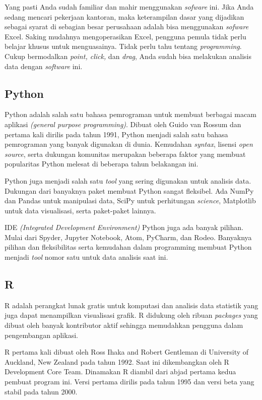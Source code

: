 \documentclass[openany]{book}
\begin{document}
Yang pasti Anda sudah familiar dan mahir menggunakan \emph{sofware} ini.
Jika Anda sedang mencari pekerjaan kantoran, maka keterampilan dasar
yang dijadikan sebagai syarat di sebagian besar perusahaan adalah bisa
menggunakan \emph{sofware} Excel. Saking mudahnya mengoperasikan Excel,
pengguna pemula tidak perlu belajar khusus untuk menguasainya. Tidak
perlu tahu tentang \emph{programming}. Cukup bermodalkan \emph{point,
click,} dan \emph{drag}, Anda sudah bisa melakukan analisis data dengan
\emph{software} ini.

\subsection{Python}\label{python}

Python adalah salah satu bahasa pemrograman untuk membuat berbagai macam
aplikasi \emph{(general purpose programming)}. Dibuat oleh Guido van
Rossum dan pertama kali dirilis pada tahun 1991, Python menjadi salah
satu bahasa pemrograman yang banyak digunakan di dunia. Kemudahan
\emph{syntax}, lisensi \emph{open source}, serta dukungan komunitas
merupakan beberapa faktor yang membuat popularitas Python melesat di
beberapa tahun belakangan ini.

Python juga menjadi salah satu \emph{tool} yang sering digunakan untuk
analisis data. Dukungan dari banyaknya paket membuat Python sangat
fleksibel. Ada NumPy dan Pandas untuk manipulasi data, SciPy untuk
perhitungan \emph{science}, Matplotlib untuk data visualisasi, serta
paket-paket lainnya.

IDE \emph{(Integrated Development Environment)} Python juga ada banyak
pilihan. Mulai dari Spyder, Jupyter Notebook, Atom, PyCharm, dan Rodeo.
Banyaknya pilihan dan fleksibilitas serta kemudahan dalam programming
membuat Python menjadi \emph{tool} nomor satu untuk data analisis saat
ini.

\subsection{R}\label{r}

R adalah perangkat lunak gratis untuk komputasi dan analisis data
statistik yang juga dapat menampilkan visualisasi grafik. R didukung
oleh ribuan \emph{packages} yang dibuat oleh banyak kontributor aktif
sehingga memudahkan pengguna dalam pengembangan aplikasi.

R pertama kali dibuat oleh Ross Ihaka and Robert Gentleman di University
of Auckland, New Zealand pada tahun 1992. Saat ini dikembangkan oleh R
Development Core Team. Dinamakan R diambil dari abjad pertama kedua
pembuat program ini. Versi pertama dirilis pada tahun 1995 dan versi
beta yang stabil pada tahun 2000.
\end{document}
